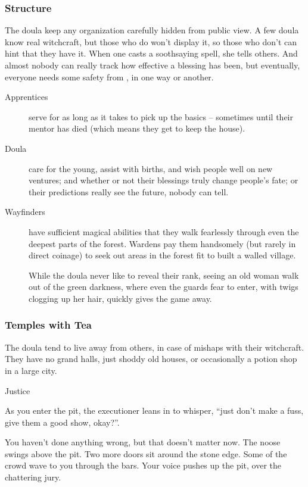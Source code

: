 \begin{multicols}{2}
\subsubsection{Structure}
The doula keep any organization carefully hidden from public view.
A few doula know real witchcraft, but those who do won't display it, so those who don't can hint that they have it.
When one casts a soothsaying spell, she tells others.
And almost nobody can really track how effective a blessing has been, but eventually, everyone needs some safety from \hphantom{Nulla}, in one way or another.

\begin{description}
  \item[Apprentices]
  serve for as long as it takes to pick up the basics -- sometimes until their mentor has died (which means they get to keep the house).
  \item[Doula]
  care for the young, assist with births, and wish people well on new ventures; and whether or not their blessings truly change people's fate; or their predictions really see the future, nobody can tell.
  \item[Wayfinders]
  have sufficient magical abilities that they walk fearlessly through even the deepest parts of the forest.
  Wardens pay them handsomely (but rarely in direct coinage) to seek out areas in the forest fit to built a walled village.

  While the doula never like to reveal their rank, seeing an old woman walk out of the green darkness, where even the \glspl{guard} fear to enter, with twigs clogging up her hair, quickly gives the game away.
\end{description}

\subsubsection{Temples with Tea}
The doula tend to live away from others, in case of mishaps with their witchcraft.
They have no grand halls, just shoddy old houses, or occasionally a potion shop in a large city.

  {\statDot}%
  {Justice}%
  {
    As you enter the pit, the executioner leans in to whisper, ``just don't make a fuss, give them a good show, okay?''.

    You haven't done anything wrong, but that doesn't matter now.
    The noose swings above the pit.
    Two more doors sit around the stone edge.
    Some of the crowd wave to you through the bars.
    Your voice pushes up the pit, over the chattering jury.

}
\end{multicols}
